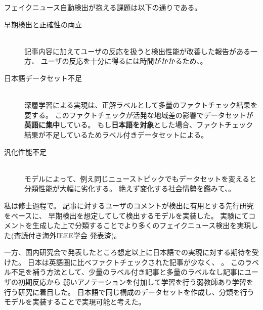 フェイクニュース自動検出が抱える課題は以下の通りである。
\begin{description}
    \item[早期検出と正確性の両立] \mbox{}\\
        記事内容に加えてユーザの反応を扱うと検出性能が改善した報告がある\cite{Wu:2018:TFF:3159652.3159677}一方、
        ユーザの反応を十分に得るには時間がかかるため、。
    \item[日本語データセット不足] \mbox{}\\
        深層学習による実現は、正解ラベルとして多量のファクトチェック結果を要する。
        このファクトチェックが活発な地域差の影響でデータセットが\textbf{英語に集中}\cite{fakenewsnet}している。
        もし\textbf{日本語を対象}とした場合、ファクトチェック結果が不足しているためラベル付きデータセットによる。
    \item[汎化性能不足] \mbox{}\\
        モデルによって、例え同じニューストピックでもデータセットを変えると分類性能が大幅に劣化する\cite{coviddiff}。
        絶えず変化する社会情勢を鑑みて、。
\end{description}

私は修士過程で。
記事に対するユーザのコメントが検出に有用とする先行研究をベースに、
早期検出を想定してして検出するモデルを実装した。
実験にてコメントを生成した上で分類することでより多くのフェイクニュース検出を実現した(査読付き海外IEEE学会 発表済\cite{ines})。

一方、国内研究会で発表したところ想定以上に日本語での実現に対する期待を受けた。
日本は英語圏に比べファクトチェックされた記事が少なく、
。
このラベル不足を補う方法として、少量のラベル付き記事と多量のラベルなし記事にユーザの初期反応から
弱いアノテーションを付加して学習を行う弱教師あり学習を行う研究\cite{mwss}に着目した。
日本語で同じ構成のデータセットを作成し、分類を行うモデルを実装することで実現可能と考えた。


